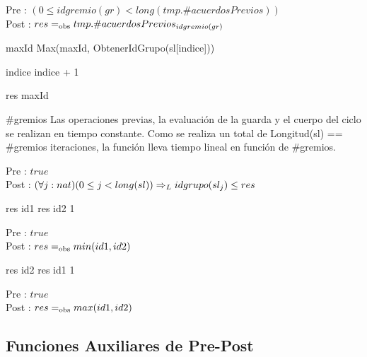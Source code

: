 Pre : \ensuremath{(0 \leq idgremio(gr) < long(tmp.\#acuerdosPrevios))}
\\
Post : \ensuremath{ res \igobs tmp.\#acuerdosPrevios_{idgremio(gr)}}


{
	\state {} 									

	\state
	\state {} 								
							
		\state
		
		\state maxId \asig Max(maxId, ObtenerIdGrupo(sl[indice]))			

		\state
		\state indice \asig indice + 1								
	\endwhile
	\state

	\state res \asig maxId											
}
{ \#gremios }
{ Las operaciones previas, la evaluaci\'on de la guarda y el cuerpo del ciclo se realizan en tiempo constante. Como se realiza un total de Longitud(sl) == \#gremios iteraciones, la funci\'on lleva tiempo lineal en funci\'on de \#gremios. }

Pre : \ensuremath{true}
\\
Post : \ensuremath{(\forall j : nat) (0 \leq j < long(sl)) \entoncesL idgrupo(sl_{j}) \leq res}


{
						
		\state res \asig id1			
	\Else
		\state res \asig id2			
	\endif
}
{1}
{}

Pre : \ensuremath{true}
\\
Post : \ensuremath{res \igobs min(id1, id2)}


{
						
		\state res \asig id2			
	\Else
		\state res \asig id1			
	\endif
}
{1}
{}

Pre : \ensuremath{true}
\\
Post : \ensuremath{res \igobs max(id1, id2)}

\subsection{Funciones Auxiliares de Pre-Post}


\vspace{20px}
